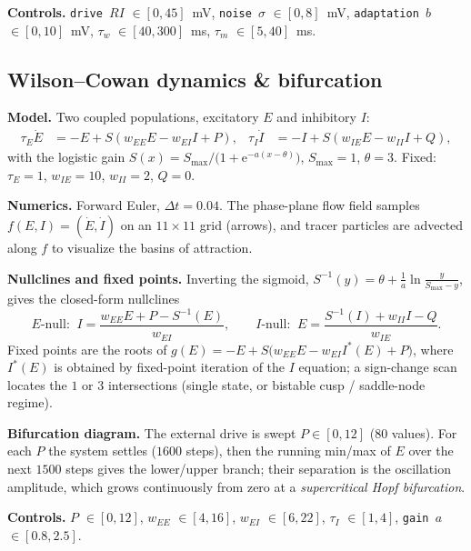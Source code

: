 \documentclass[11pt]{article}
\newcommand{\param}[1]{\textcolor{neonmag}{\texttt{#1}}}
\newcommand{\E}{\mathrm{e}}
\begin{document}
\textbf{Controls.} \param{drive $RI$} $\in[0,45]$~mV, \param{noise $\sigma$} $\in[0,8]$~mV,
\param{adaptation $b$} $\in[0,10]$~mV, \param{$\tau_w$} $\in[40,300]$~ms,
\param{$\tau_m$} $\in[5,40]$~ms.

\subsection{Wilson--Cowan dynamics \& bifurcation}

\textbf{Model.} Two coupled populations, excitatory $E$ and inhibitory $I$:
\begin{align}
\tau_E \dot E &= -E + S\!\left(w_{EE} E - w_{EI} I + P\right), &
\tau_I \dot I &= -I + S\!\left(w_{IE} E - w_{II} I + Q\right),
\end{align}
with the logistic gain $S(x) = S_{\max}\big/\big(1 + \E^{-a(x-\theta)}\big)$,
$S_{\max}=1$, $\theta=3$. Fixed: $\tau_E=1$, $w_{IE}=10$, $w_{II}=2$, $Q=0$.

\textbf{Numerics.} Forward Euler, $\Delta t = 0.04$. The phase-plane flow field samples
$f(E,I)=(\dot E,\dot I)$ on an $11\times11$ grid (arrows), and tracer particles are advected
along $f$ to visualize the basins of attraction.

\textbf{Nullclines and fixed points.} Inverting the sigmoid,
$S^{-1}(y)=\theta + \frac1a\ln\!\frac{y}{S_{\max}-y}$, gives the closed-form nullclines
\[
\text{$E$-null:}\;\; I = \frac{w_{EE}E + P - S^{-1}(E)}{w_{EI}},\qquad
\text{$I$-null:}\;\; E = \frac{S^{-1}(I) + w_{II}I - Q}{w_{IE}}.
\]
Fixed points are the roots of $g(E) = -E + S\!\big(w_{EE}E - w_{EI} I^\ast(E) + P\big)$,
where $I^\ast(E)$ is obtained by fixed-point iteration of the $I$ equation; a sign-change scan
locates the $1$ or $3$ intersections (single state, or bistable cusp / saddle-node regime).

\textbf{Bifurcation diagram.} The external drive is swept $P\in[0,12]$ ($80$ values). For each
$P$ the system settles ($1600$ steps), then the running min/max of $E$ over the next $1500$
steps gives the lower/upper branch; their separation is the oscillation amplitude, which grows
continuously from zero at a \emph{supercritical Hopf bifurcation}.

\textbf{Controls.} \param{$P$} $\in[0,12]$, \param{$w_{EE}$} $\in[4,16]$,
\param{$w_{EI}$} $\in[6,22]$, \param{$\tau_I$} $\in[1,4]$, \param{gain $a$} $\in[0.8,2.5]$.

\end{document}
